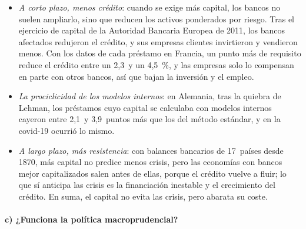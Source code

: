 \documentclass[11pt]{article}
\begin{document}
\begin{itemize}
\item \emph{A corto plazo, menos crédito}: cuando se exige más capital, los bancos no suelen ampliarlo, sino que reducen los activos ponderados por riesgo. Tras el ejercicio de capital de la Autoridad Bancaria Europea de 2011, los bancos afectados redujeron el crédito, y sus empresas clientes invirtieron y vendieron menos\nocite{GroppMoskOngenaWix2019}. Con los datos de cada préstamo en Francia, un punto más de requisito reduce el crédito entre un 2,3~y un 4,5~\%, y las empresas solo lo compensan en parte con otros bancos, así que bajan la inversión y el empleo\nocite{FraisseLeThesmar2020}.
\item \emph{La prociclicidad de los modelos internos}: en Alemania, tras la quiebra de Lehman, los préstamos cuyo capital se calculaba con modelos internos cayeron entre 2,1~y 3,9~puntos más que los del método estándar\nocite{BehnHaselmannWachtel2016}, y en la covid-19 ocurrió lo mismo\nocite{FiordelisiEtAl2022}.
\item \emph{A largo plazo, más resistencia}: con balances bancarios de 17~países desde 1870, más capital no predice menos crisis, pero las economías con bancos mejor capitalizados salen antes de ellas, porque el crédito vuelve a fluir; lo que sí anticipa las crisis es la financiación inestable y el crecimiento del crédito\nocite{JordaRichterSchularickTaylor2021}. En suma, el capital no evita las crisis, pero abarata su coste\nocite{Martynova2015}.
\end{itemize}

\paragraph{c) ¿Funciona la política macroprudencial?}
\end{document}
